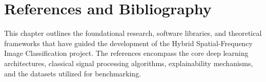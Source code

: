 \chapter*{References and Bibliography}

This chapter outlines the foundational research, software libraries, and theoretical frameworks that have guided the development of the Hybrid Spatial-Frequency Image Classification project. The references encompass the core deep learning architectures, classical signal processing algorithms, explainability mechanisms, and the datasets utilized for benchmarking.

\renewcommand{\bibname}{} %
\vspace{-2em} %

